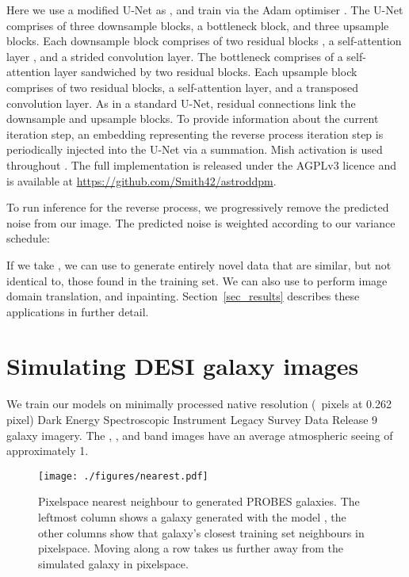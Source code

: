 \documentclass[fleqn,usenatbib]{mnras}
\begin{document}
Here we use a modified U-Net as 
\citep{cite_ronneberger2015,cite_salimans2017}, and train via the Adam
optimiser \citep{cite_kingma2015}.  The U-Net comprises of three downsample
blocks, a bottleneck block, and three upsample blocks. Each downsample block
comprises of two residual blocks \citep{cite_srivastava2015,cite_he2015}, a
self-attention layer \citep{cite_bahdanau2014,cite_cheng2016}, and a strided
convolution layer. The bottleneck comprises of a self-attention layer
sandwiched by two residual blocks. Each upsample block comprises of two
residual blocks, a self-attention layer, and a transposed convolution layer. As
in a standard U-Net, residual connections link the downsample and upsample
blocks. To provide information about the current iteration step, an embedding
representing the reverse process iteration step is periodically injected into
the U-Net via a summation.  Mish activation is used throughout
\citep{cite_mish}. The full implementation is released under the AGPLv3 licence
and is available at \url{https://github.com/Smith42/astroddpm}.

To run inference for the reverse process, we progressively remove the predicted
noise  from our image. The predicted noise is weighted
according to our variance schedule:


If we take , we can use  to generate entirely novel data that are
similar, but not identical to, those found in the training set. We can also use
 to perform image domain translation, and inpainting.
Section~\ref{sec_results} describes these applications in further detail.

\section{Simulating DESI galaxy images} \label{sec_application}

We train our models on minimally processed native resolution (~pixels at 0.262\,pixel) Dark Energy Spectroscopic Instrument
\citep[DESI;][]{cite_desi} Legacy Survey Data Release 9 galaxy imagery. The
, , and  band images have an average atmospheric seeing of approximately 1.

\begin{figure}
    \centering
    \texttt{[image: ./figures/nearest.pdf]}
    \caption{Pixelspace nearest neighbour to generated PROBES galaxies. The leftmost
    column shows a galaxy generated with the model , the other
    columns show that galaxy's closest training set neighbours in pixelspace.
    Moving along a row takes us further away from
    the simulated galaxy in pixelspace.}
    \label{fig_closest}
\end{figure}
\end{document}
